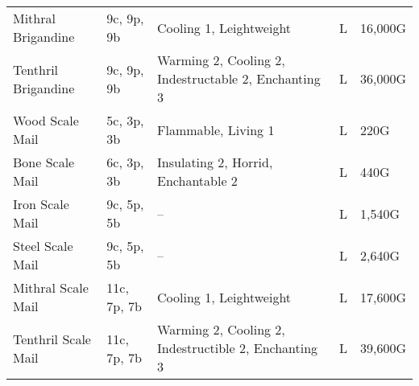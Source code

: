 \begin{longtable}{p{3.5cm} | p{1.5cm} | p{5cm} | p{1cm} | p{1.25cm}}
	Mithral Brigandine & 9c, 9p, 9b & Cooling 1, Leightweight & L & 16,000G\\
	
	Tenthril Brigandine & 9c, 9p, 9b & Warming 2, Cooling 2, Indestructable 2, Enchanting 3 & L & 36,000G\\
	
	Wood Scale Mail & 5c, 3p, 3b & Flammable, Living 1 & L & 220G\\
	
	Bone Scale Mail & 6c, 3p, 3b & Insulating 2, Horrid, Enchantable 2 & L & 440G\\
	
	Iron Scale Mail & 9c, 5p, 5b & -- & L & 1,540G\\
	
	Steel Scale Mail & 9c, 5p, 5b & -- & L & 2,640G\\
	
	Mithral Scale Mail & 11c, 7p, 7b & Cooling 1, Leightweight & L & 17,600G\\
	
	Tenthril Scale Mail & 11c, 7p, 7b & Warming 2, Cooling 2, Indestructible 2, Enchanting 3 & L & 39,600G\\
\end{longtable}